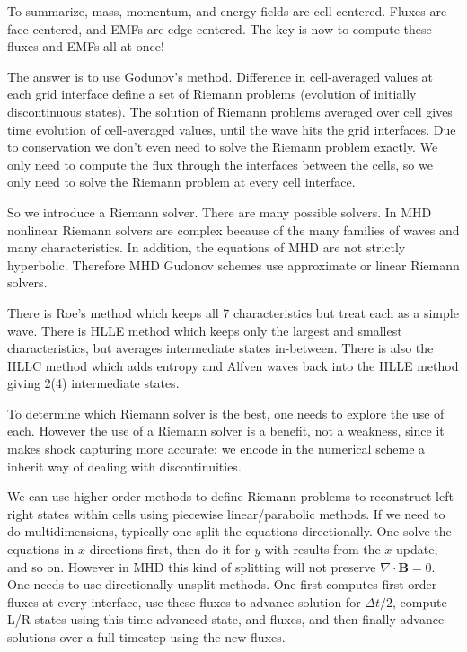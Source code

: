 \documentclass[letterpaper, 11pt]{article}
\numberwithin{equation}{section}
\numberwithin{figure}{section}
\begin{document}
To summarize, mass, momentum, and energy fields are cell-centered. Fluxes are
face centered, and EMFs are edge-centered. The key is now to compute these
fluxes and EMFs all at once!

The answer is to use Godunov's method. Difference in cell-averaged values at
each grid interface define a set of Riemann problems (evolution of initially
discontinuous states). The solution of Riemann problems averaged over cell gives
time evolution of cell-averaged values, until the wave hits the grid interfaces.
Due to conservation we don't even need to solve the Riemann problem exactly. We
only need to compute the flux through the interfaces between the cells, so we
only need to solve the Riemann problem at every cell interface.

So we introduce a Riemann solver. There are many possible solvers. In MHD
nonlinear Riemann solvers are complex because of the many families of waves and
many characteristics. In addition, the equations of MHD are not strictly
hyperbolic. Therefore MHD Gudonov schemes use approximate or linear Riemann
solvers.

There is Roe's method which keeps all 7 characteristics but treat each as a
simple wave. There is HLLE method which keeps only the largest and smallest
characteristics, but averages intermediate states in-between. There is also the
HLLC method which adds entropy and Alfven waves back into the HLLE method giving
2(4) intermediate states.

To determine which Riemann solver is the best, one needs to explore the use of
each. However the use of a Riemann solver is a benefit, not a weakness, since it
makes shock capturing more accurate: we encode in the numerical scheme a inherit
way of dealing with discontinuities.

We can use higher order methods to define Riemann problems to reconstruct
left-right states within cells using piecewise linear/parabolic methods. If we
need to do multidimensions, typically one split the equations directionally. One
solve the equations in $x$ directions first, then do it for $y$ with results
from the $x$ update, and so on. However in MHD this kind of splitting will not
preserve $\nabla\cdot \mathbf{B} = 0$. One needs to use directionally unsplit
methods. One first computes first order fluxes at every interface, use these
fluxes to advance solution for $\Delta t/2$, compute L/R states using this
time-advanced state, and fluxes, and then finally advance solutions over a full
timestep using the new fluxes.
\end{document}
